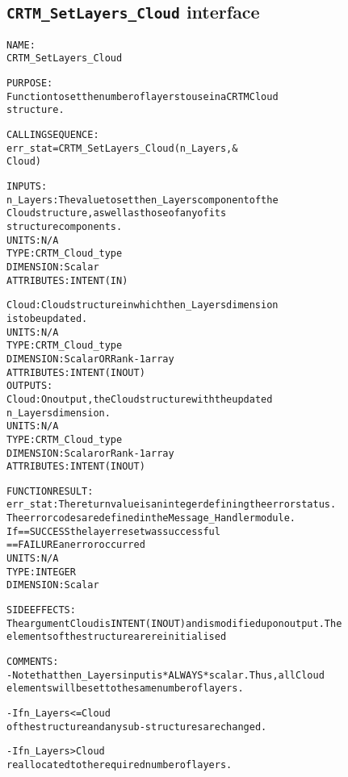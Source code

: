 \subsection{\texttt{CRTM\_SetLayers\_Cloud} interface}
  \label{sec:CRTM_SetLayers_Cloud_interface}
  \begin{alltt}
 
  NAME:
        CRTM_SetLayers_Cloud
  
  PURPOSE:
        Function to set the number of layers to use in a CRTM Cloud
        structure.
 
  CALLING SEQUENCE:
        err_stat = CRTM_SetLayers_Cloud( n_Layers, &
                                         Cloud     )
 
  INPUTS:
        n_Layers:     The value to set the n_Layers component of the 
                      Cloud structure, as well as those of any of its
                      structure components.
                      UNITS:      N/A
                      TYPE:       CRTM_Cloud_type
                      DIMENSION:  Scalar
                      ATTRIBUTES: INTENT(IN)
 
        Cloud:        Cloud structure in which the n_Layers dimension
                      is to be updated.
                      UNITS:      N/A
                      TYPE:       CRTM_Cloud_type
                      DIMENSION:  Scalar OR Rank-1 array
                      ATTRIBUTES: INTENT(IN OUT)
  OUTPUTS:
        Cloud:        On output, the Cloud structure with the updated
                      n_Layers dimension.
                      UNITS:      N/A
                      TYPE:       CRTM_Cloud_type
                      DIMENSION:  Scalar or Rank-1 array
                      ATTRIBUTES: INTENT(IN OUT)
 
  FUNCTION RESULT:
        err_stat: The return value is an integer defining the error status.
                      The error codes are defined in the Message_Handler module.
                      If == SUCCESS the layer reset was successful
                         == FAILURE an error occurred
                      UNITS:      N/A
                      TYPE:       INTEGER
                      DIMENSION:  Scalar
 
  SIDE EFFECTS:
        The argument Cloud is INTENT(IN OUT) and is modified upon output. The
        elements of the structure are reinitialised
 
  COMMENTS:
        - Note that the n_Layers input is *ALWAYS* scalar. Thus, all Cloud
          elements will be set to the same number of layers.
 
        - If n_Layers <= Cloud%Max_Layers, then only the dimension value
          of the structure and any sub-structures are changed.
 
        - If n_Layers > Cloud%Max_Layers, then the entire structure is
          reallocated to the required number of layers.
 
  \end{alltt}
